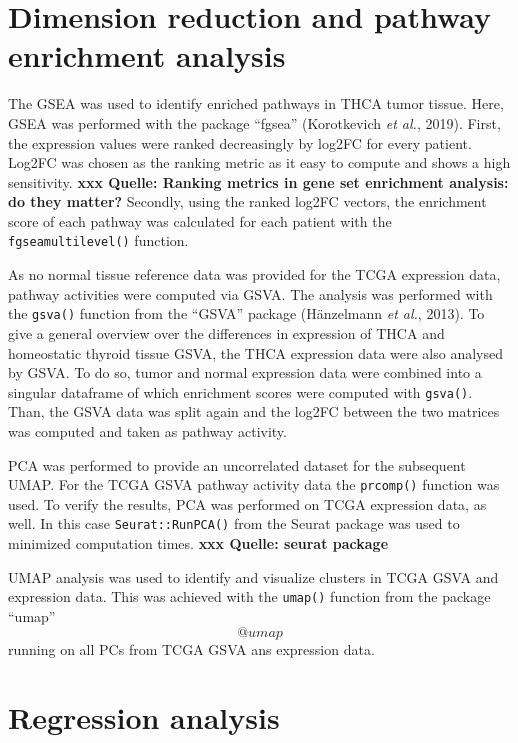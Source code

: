 \documentclass[
  parskip,
  oneside]{scrreprt}
\begin{document}
\hypertarget{dimension-reduction-and-pathway-enrichment-analysis}{%
\section{Dimension reduction and pathway enrichment
analysis}\label{dimension-reduction-and-pathway-enrichment-analysis}}

The GSEA was used to identify enriched pathways in THCA tumor tissue.
Here, GSEA was performed with the package ``fgsea'' (Korotkevich
\emph{et al.}, 2019). First, the expression values were ranked
decreasingly by log2FC for every patient. Log2FC was chosen as the
ranking metric as it easy to compute and shows a high sensitivity.
\textbf{xxx Quelle: Ranking metrics in gene set enrichment analysis: do
they matter?} Secondly, using the ranked log2FC vectors, the enrichment
score of each pathway was calculated for each patient with the
\texttt{fgseamultilevel()} function.

As no normal tissue reference data was provided for the TCGA expression
data, pathway activities were computed via GSVA. The analysis was
performed with the \texttt{gsva()} function from the ``GSVA'' package
(Hänzelmann \emph{et al.}, 2013). To give a general overview over the
differences in expression of THCA and homeostatic thyroid tissue GSVA,
the THCA expression data were also analysed by GSVA. To do so, tumor and
normal expression data were combined into a singular dataframe of which
enrichment scores were computed with \texttt{gsva()}. Than, the GSVA
data was split again and the log2FC between the two matrices was
computed and taken as pathway activity.

PCA was performed to provide an uncorrelated dataset for the subsequent
UMAP. For the TCGA GSVA pathway activity data the \texttt{prcomp()}
function was used. To verify the results, PCA was performed on TCGA
expression data, as well. In this case \texttt{Seurat::RunPCA()} from
the Seurat package was used to minimized computation times. \textbf{xxx
Quelle: seurat package}

UMAP analysis was used to identify and visualize clusters in TCGA GSVA
and expression data. This was achieved with the \texttt{umap()} function
from the package ``umap'' \[@umap\] running on all PCs from TCGA GSVA
ans expression data.

\hypertarget{regression-analysis}{%
\section{Regression analysis}\label{regression-analysis}}
\end{document}
